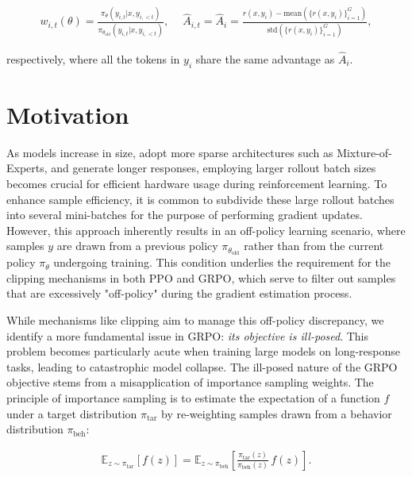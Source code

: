\begin{align}
    w_{i,t}(\theta)=\frac{ \pi_{\theta} (y_{i,t} | x, y_{i,<t}) }{ \pi_{\theta_\text{old}} (y_{i,t} | x,y_{i,<t})},\quad\ 
    \widehat{A}_{i,t} = \widehat{A}_{i} = \frac{r(x, y_i) - \mathrm{mean} \left( \{ r(x, y_i) \}_{i=1}^G \right) }{ \mathrm{std} \left( \{ r(x, y_i) \}_{i=1}^G \right) },
\end{align}

respectively, where all the tokens in $y_i$ share the same advantage as $\widehat{A}_{i}$.

\section{Motivation}
\label{sec:motivation}

As models increase in size, adopt more sparse architectures such as Mixture-of-Experts, and generate longer responses, employing larger rollout batch sizes becomes crucial for efficient hardware usage during reinforcement learning. To enhance sample efficiency, it is common to subdivide these large rollout batches into several mini-batches for the purpose of performing gradient updates. However, this approach inherently results in an off-policy learning scenario, where samples $y$ are drawn from a previous policy $\pi_{\theta_\text{old}}$ rather than from the current policy $\pi_\theta$ undergoing training. This condition underlies the requirement for the clipping mechanisms in both PPO and GRPO, which serve to filter out samples that are excessively "off-policy" during the gradient estimation process.

While mechanisms like clipping aim to manage this off-policy discrepancy, we identify a more fundamental issue in GRPO: \textit{its objective is ill-posed}. This problem becomes particularly acute when training large models on long-response tasks, leading to catastrophic model collapse. The ill-posed nature of the GRPO objective stems from a misapplication of importance sampling weights. The principle of importance sampling is to estimate the expectation of a function $f$ under a target distribution $\pi_\text{tar}$ by re-weighting samples drawn from a behavior distribution $\pi_\text{beh}$:

\begin{align}
\mathbb{E}_{z \sim \pi_\text{tar}} \left[ f(z) \right] = \mathbb{E}_{z \sim \pi_\text{beh}} \left[ \frac{ \pi_\text{tar} (z) }{ \pi_\text{beh} (z)} \, f(z) \right].
\end{align}

